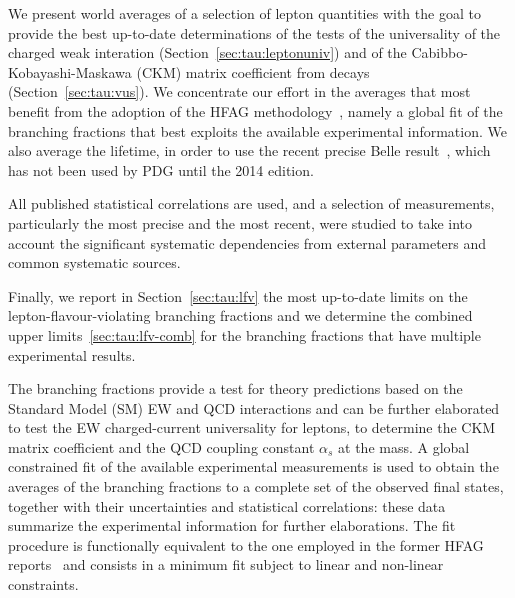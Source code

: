 We present world averages of a selection of \mtau lepton quantities with
the goal to provide the best up-to-date determinations of the tests of the
universality of the charged weak interation
(Section~\ref{sec:tau:leptonuniv}) and of the Cabibbo-Kobayashi-Maskawa
(CKM) matrix coefficient \Vus from \mtau decays
(Section~\ref{sec:tau:vus}).  We concentrate our effort in the averages
that most benefit from the adoption of the HFAG
methodology~\cite{Asner:2010qj}, namely a global fit of the \mtau branching
fractions that best exploits the available experimental information. We
also average the \mtau lifetime, in order to use the recent precise Belle
result~\cite{Belous:2013dba}, which has not been used by PDG until the 2014
edition.

All published statistical correlations are used, and a selection of
measurements, particularly the most precise and the most recent, were
studied to take into account the significant systematic dependencies from
external parameters and common systematic sources.

Finally, we report in Section~\ref{sec:tau:lfv} the most up-to-date limits
on the lepton-flavour-violating \mtau branching fractions and we determine
the combined upper limits~\ref{sec:tau:lfv-comb} for the branching
fractions that have multiple experimental results.

\label{sec:tau:br-fit}

The \mtau branching fractions provide a test for theory predictions based
on the Standard Model (SM) EW and QCD interactions and can be further
elaborated to test the EW charged-current universality for leptons, to
determine the CKM matrix coefficient \Vus and the QCD coupling constant
$\alpha_s$ at the \mtau mass. A global constrained fit of the available
experimental measurements is used to obtain the averages of the \mtau
branching fractions to a complete set of the observed final states,
together with their uncertainties and statistical correlations: these data
summarize the experimental information for further elaborations.
\label{sec:tau:fit}
The fit procedure is functionally equivalent to the one employed in the
former HFAG reports~\cite{Asner:2010qj,Amhis:2012bh} and consists in a minimum \chisq
fit subject to linear and non-linear constraints.

